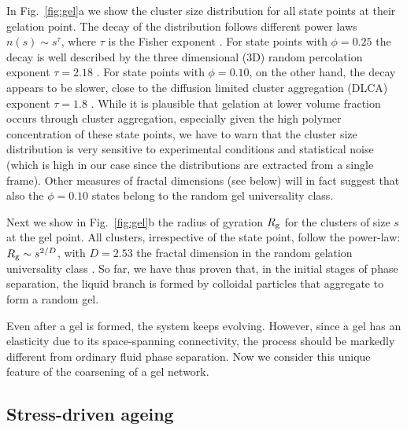 \documentclass[twocolumn,superscriptaddress,showpacs,preprintnumbers,
amsmath,amssymb,prl]{revtex4-1}
\begin{document}
In Fig.~\ref{fig:gel}a we show the cluster size distribution for all state points at their gelation point. The decay of the distribution
follows different power laws $n(s)\sim s^\tau$, where $\tau$ is the Fisher exponent \cite{family2012kinetics}.
For state points with $\phi=0.25$ the decay is well described by the three dimensional (3D) random percolation exponent $\tau=2.18$ \cite{family2012kinetics}.
For state points with $\phi=0.10$, on the other hand, the decay appears to be slower, close to the diffusion limited cluster aggregation (DLCA) 
exponent $\tau=1.8$ \cite{family2012kinetics}. While it is plausible that gelation at lower volume fraction occurs through cluster aggregation, especially given 
the high polymer concentration of these state points, we have to warn that the cluster size distribution is very sensitive to
experimental conditions and statistical noise (which is high in our case since the distributions are extracted from a single frame).
Other measures of fractal dimensions (see below) will in fact suggest that also the $\phi=0.10$ states belong to the random gel universality class.

Next we show in Fig.~\ref{fig:gel}b the radius of gyration $R_{\rm g}$ for the clusters of size $s$ at the gel point. All clusters, irrespective
of the state point, follow the power-law: $R_{\rm g}\sim s^{2/D}$, with $D=2.53$ the fractal dimension in the random gelation
universality class \cite{family2012kinetics}. So far, we have thus proven that, in the initial stages of phase separation, the liquid branch is
formed by colloidal particles that aggregate to form a random gel.

Even after a gel is formed, the system keeps evolving.
However, since a gel has an elasticity due to its space-spanning connectivity, the process should be markedly different from 
ordinary fluid phase separation. Now we consider this unique feature of the coarsening of a gel network.  

\subsection*{Stress-driven ageing}
\end{document}

